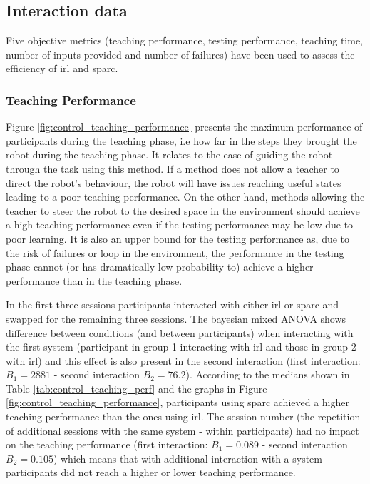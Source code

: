 \subsection{Interaction data}

Five objective metrics (teaching performance, testing performance, teaching time, number of inputs provided and number of failures) have been used to assess the efficiency of \gls{irl} and \gls{sparc}. 

\subsubsection{Teaching Performance}

Figure \ref{fig:control_teaching_performance} presents the maximum performance of participants during the teaching phase, i.e how far in the steps they brought the robot during the teaching phase. It relates to the ease of guiding the robot through the task using this method. If a method does not allow a teacher to direct the robot's behaviour, the robot will have issues reaching useful states leading to a poor teaching performance. On the other hand, methods allowing the teacher to steer the robot to the desired space in the environment should achieve a high teaching performance even if the testing performance may be low due to poor learning. It is also an upper bound for the testing performance as, due to the risk of failures or loop in the environment, the performance in the testing phase cannot (or has dramatically low probability to) achieve a higher performance than in the teaching phase.

In the first three sessions participants interacted with either \gls{irl} or \gls{sparc} and swapped for the remaining three sessions. The bayesian mixed ANOVA shows difference between conditions (and between participants) when interacting with the first system (participant in group 1 interacting with \gls{irl} and those in group 2 with \gls{irl}) and this effect is also present in the second interaction (first interaction:$B_1=2881$ - second interaction $B_2 = 76.2$). According to the medians shown in Table \ref{tab:control_teaching_perf} and the graphs in Figure \ref{fig:control_teaching_performance}, participants using \gls{sparc} achieved a higher teaching performance than the ones using \gls{irl}. The session number (the repetition of additional sessions with the same system - within participants) had no impact on the teaching performance (first interaction: $B_1=0.089$ - second interaction $B_2=0.105$) which means that with additional interaction with a system participants did not reach a higher or lower teaching performance.

